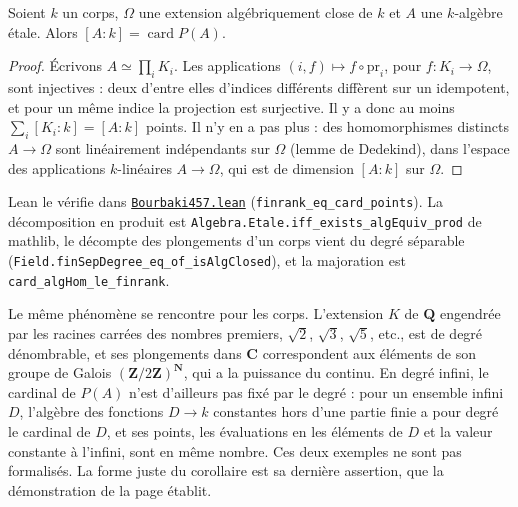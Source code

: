 \begin{encadre}
\begin{enonce}
Soient $k$ un corps, $\Omega$ une extension algébriquement close de $k$ et $A$ une $k$-algèbre étale. Alors $[A : k] = \operatorname{card} P(A)$.
\end{enonce}
\end{encadre}

\begin{proof}
Écrivons $A \simeq \prod_i K_i$. Les applications $(i, f) \mapsto f \circ \mathrm{pr}_i$, pour $f : K_i \to \Omega$, sont injectives : deux d'entre elles d'indices différents diffèrent sur un idempotent, et pour un même indice la projection est surjective. Il y a donc au moins $\sum_i [K_i : k] = [A : k]$ points. Il n'y en a pas plus : des homomorphismes distincts $A \to \Omega$ sont linéairement indépendants sur $\Omega$ (lemme de Dedekind), dans l'espace des applications $k$-linéaires $A \to \Omega$, qui est de dimension $[A : k]$ sur $\Omega$.
\end{proof}

\begin{sloppypar}
\noindent Lean le vérifie dans \href{\leanblob/Bourbaki457.lean}{\texttt{Bourbaki457.lean}} (\texttt{finrank\_eq\_card\_points}). La décomposition en produit est \texttt{Algebra.Etale.iff\_exists\_algEquiv\_prod} de mathlib, le décompte des plongements d'un corps vient du degré séparable (\texttt{Field.finSepDegree\_eq\_of\_isAlgClosed}), et la majoration est \texttt{card\_algHom\_le\_finrank}.
\end{sloppypar}

\begin{remarque}
Le même phénomène se rencontre pour les corps. L'extension $K$ de $\mathbf Q$ engendrée par les racines carrées des nombres premiers, $\sqrt 2$, $\sqrt 3$, $\sqrt 5$, etc., est de degré dénombrable, et ses plongements dans $\mathbf C$ correspondent aux éléments de son groupe de Galois $(\mathbf Z/2\mathbf Z)^{\mathbf N}$, qui a la puissance du continu. En degré infini, le cardinal de $P(A)$ n'est d'ailleurs pas fixé par le degré : pour un ensemble infini $D$, l'algèbre des fonctions $D \to k$ constantes hors d'une partie finie a pour degré le cardinal de $D$, et ses points, les évaluations en les éléments de $D$ et la valeur constante à l'infini, sont en même nombre. Ces deux exemples ne sont pas formalisés. La forme juste du corollaire est sa dernière assertion, que la démonstration de la page établit.
\end{remarque}
